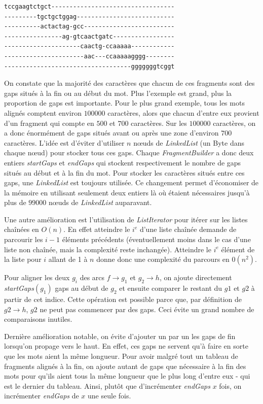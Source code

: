 \documentclass{article}
\begin{document}
\begin{verbatim}
tccgaagtctgct----------------------------------
---------tgctgctggag---------------------------
----------actactag-gcc-------------------------
----------------ag-gtcaactgatc-----------------
---------------------caactg-ccaaaaa------------
----------------------aac---ccaaaaagggg--------
-----------------------------------gggggggtcggt
\end{verbatim}

On constate que la majorité des caractères que chacun de ces fragments sont des gaps situés à la fin ou au début du mot. Plus l'exemple est grand, plus la proportion de gaps est importante. Pour le plus grand exemple, tous les mots alignés comptent environ $100000$ caractères, alors que chacun d'entre eux provient d'un fragment qui compte en $500$ et $700$ caractères. Sur les $100000$ caractères, on a donc énormément de gaps situés avant ou après une zone d'environ $700$ caractères. L'idée est d'éviter d'utiliser $n$ nœuds de \textit{LinkedList} (un Byte dans chaque nœud) pour stocker tous ces gaps.
Chaque \textit{FragmentBuilder} a donc deux entiers \textit{startGaps} et \textit{endGaps} qui stockent respectivement le nombre de gaps situés au début et à la fin du mot. Pour stocker les caractères situés entre ces gaps, une \textit{LinkedList} est toujours utilisée. Ce changement permet d'économiser de la mémoire en utilisant seulement deux entiers là où étaient nécessaires jusqu'à plus de $99000$ nœuds de \textit{LinkedList} auparavant. 

Une autre amélioration est l'utilisation de \textit{ListIterator} pour itérer sur les listes chaînées en $O(n)$. En effet atteindre le $i^e$ d'une liste chaînée demande de parcourir les $i-1$ éléments précédents (éventuellement moins dans le cas d'une liste non chaînée, mais la complexité reste inchangée). Atteindre le $i^e$ élément de la liste pour $i$ allant de 1 à $n$ donne donc une complexité du parcours en $0(n^2)$.

Pour aligner les deux $g_i$ des arcs $f \to g_1$ et $g_2 \to h$, on ajoute directement \textit{startGaps}$(g_1)$ gaps au début de $g_2$ et ensuite comparer le restant du $g1$ et $g2$ à partir de cet indice. Cette opération est possible parce que, par définition de $g2 \to h$, $g2$ ne peut pas commencer par des gaps. Ceci évite un grand nombre de comparaisons inutiles.

Dernière amélioration notable, on évite d'ajouter un par un les gaps de fin lorsqu'on propage vers le haut. En effet, ces gaps ne servent qu'à faire en sorte que les mots aient la même longueur. Pour avoir malgré tout un tableau de fragments alignés à la fin, on ajoute autant de gaps que nécessaire à la fin des mots pour qu'ils aient tous la même longueur que le plus long d'entre eux -  qui est le dernier du tableau. Ainsi, plutôt que d'incrémenter \textit{endGaps} $x$ fois, on incrémenter \textit{endGaps} de $x$ une seule fois.
\end{document}
